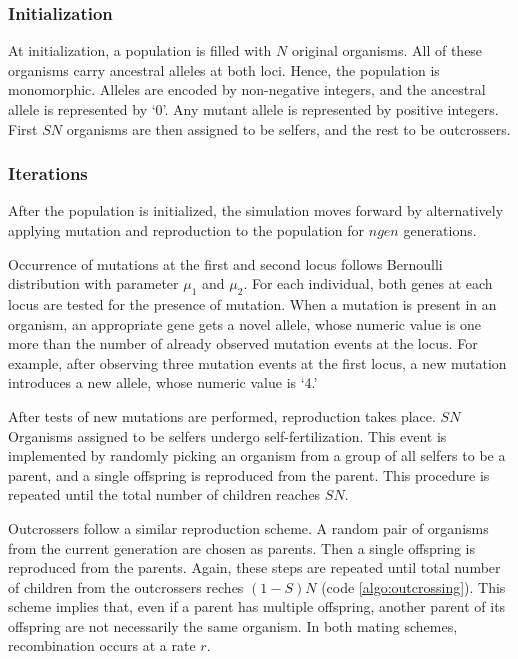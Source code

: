 \documentclass[12pt]{article}
\begin{document}
\subsubsection{Initialization}
\label{sec:initialization}

At initialization, a population is filled with
\(N\) original organisms.
All of these organisms carry ancestral alleles at both loci.
Hence, the population is monomorphic.
Alleles are encoded by non-negative integers, and the ancestral allele
is represented by `0'.
Any mutant allele is represented by positive integers.
First \(S N\) organisms are then assigned to be selfers, and
the rest to be outcrossers.

\subsubsection{Iterations}
\label{sec:iterations}

After the population is initialized, the simulation moves forward by
alternatively applying mutation and reproduction to the population for
\(ngen\) generations.

Occurrence of mutations at the first and second locus follows
Bernoulli distribution with parameter \(\mu_{1}\) and \(\mu_{2}\).
For each individual, both genes at each locus are tested for the
presence of mutation.
When a mutation is present in an organism, an appropriate gene gets
a novel allele, whose numeric value is one more than the number of
already observed mutation events at the locus.
For example, after observing three mutation events at the first locus,
a new mutation introduces a new allele, whose numeric value is `4.'

After tests of new mutations are performed, reproduction takes place.
\(S N\) Organisms assigned to be selfers undergo self-fertilization.
This event is implemented by randomly picking an organism from
a group of all selfers to be a parent, and a single
offspring is reproduced from the parent.
This procedure is repeated until the total number of children reaches
\(S N\).

Outcrossers follow a similar reproduction scheme.
A random pair of organisms from the current generation are chosen as
parents.
Then a single offspring is reproduced from the parents.
Again, these steps are repeated until total number of children from
the outcrossers reches \((1 - S)N\) (code \ref{algo:outcrossing}).
This scheme implies that, even if a parent has multiple offspring,
another parent of its offspring are not necessarily the same
organism.
In both mating schemes, recombination occurs at a rate \(r\).
\end{document}
